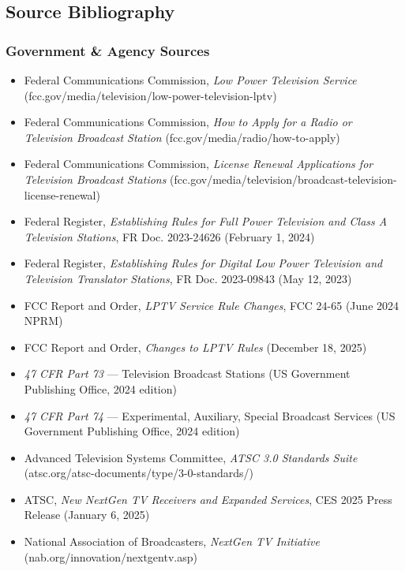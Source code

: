 \documentclass[11pt,letterpaper]{article}
\begin{document}
\subsection{Source Bibliography}

\subsubsection{Government \& Agency Sources}
\begin{itemize}[leftmargin=2em]
  \item Federal Communications Commission, \textit{Low Power Television Service} (fcc.gov/media/television/low-power-television-lptv)
  \item Federal Communications Commission, \textit{How to Apply for a Radio or Television Broadcast Station} (fcc.gov/media/radio/how-to-apply)
  \item Federal Communications Commission, \textit{License Renewal Applications for Television Broadcast Stations} (fcc.gov/media/television/broadcast-television-license-renewal)
  \item Federal Register, \textit{Establishing Rules for Full Power Television and Class A Television Stations}, FR Doc. 2023-24626 (February 1, 2024)
  \item Federal Register, \textit{Establishing Rules for Digital Low Power Television and Television Translator Stations}, FR Doc. 2023-09843 (May 12, 2023)
  \item FCC Report and Order, \textit{LPTV Service Rule Changes}, FCC 24-65 (June 2024 NPRM)
  \item FCC Report and Order, \textit{Changes to LPTV Rules} (December 18, 2025)
  \item \textit{47 CFR Part 73} --- Television Broadcast Stations (US Government Publishing Office, 2024 edition)
  \item \textit{47 CFR Part 74} --- Experimental, Auxiliary, Special Broadcast Services (US Government Publishing Office, 2024 edition)
  \item Advanced Television Systems Committee, \textit{ATSC 3.0 Standards Suite} (atsc.org/atsc-documents/type/3-0-standards/)
  \item ATSC, \textit{New NextGen TV Receivers and Expanded Services}, CES 2025 Press Release (January 6, 2025)
  \item National Association of Broadcasters, \textit{NextGen TV Initiative} (nab.org/innovation/nextgentv.asp)
\end{itemize}
\end{document}
